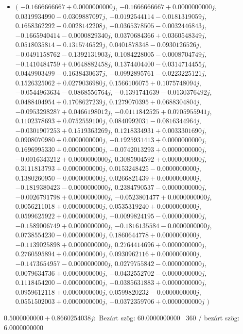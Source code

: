 \documentclass[14pt,a4paper]{article}
\begin{document}
\begin{itemize}
\item
$\big($
$-0.1666666667+0.0000000000j$, $-0.1666666667+0.0000000000j$, $0.0319934990-0.0309887097j$, $-0.0192544114-0.0181319059j$, $0.1658362292-0.0028142208j$, $-0.0365378505-0.0032446843j$, $-0.1665940414-0.0000829340j$, $0.0370684366+0.0360548349j$, $0.0518035814-0.1315746529j$, $0.0401878348-0.0930126526j$, $-0.0491158762-0.1392131903j$, $0.1084228005-0.0008704749j$, $-0.1410484759+0.0648882458j$, $0.1374404400-0.0314714455j$, $0.0449903499-0.1638430637j$, $-0.0992895761-0.0223225121j$, $0.1526325062+0.0279036980j$, $0.1566106075+0.1075748094j$, $-0.0544963634-0.0868556764j$, $-0.1391741639-0.0130376492j$, $0.0488404954+0.1708627239j$, $0.1279070395+0.0688304804j$, $-0.0953298287+0.0466198012j$, $-0.0111842525+0.0705955941j$, $0.1102378693+0.0752559100j$, $0.0840992031-0.0816344964j$, $-0.0301907253+0.1519363269j$, $0.1218334931+0.0033301690j$, $0.0908070980+0.0000000000j$, $-0.1925931413+0.0000000000j$, $0.1696995330+0.0000000000j$, $-0.0742013293+0.0000000000j$, $-0.0016343212+0.0000000000j$, $0.3085904592+0.0000000000j$, $0.3111813793+0.0000000000j$, $0.0153248425-0.0000000000j$, $0.1380260950-0.0000000000j$, $0.0266821439+0.0000000000j$, $-0.1819380423-0.0000000000j$, $0.2384790537-0.0000000000j$, $-0.0026791798+0.0000000000j$, $-0.0523801477+0.0000000000j$, $0.0056211018+0.0000000000j$, $0.0535319240+0.0000000000j$, $0.0599625922+0.0000000000j$, $-0.0099824195-0.0000000000j$, $-0.1589006749+0.0000000000j$, $-0.1816135584-0.0000000000j$, $0.0738554230-0.0000000000j$, $0.1860644778+0.0000000000j$, $-0.1139025898+0.0000000000j$, $0.2764414696+0.0000000000j$, $0.2760595894+0.0000000000j$, $0.0930962116+0.0000000000j$, $-0.1473654957-0.0000000000j$, $0.0279755842-0.0000000000j$, $0.0079634736+0.0000000000j$, $-0.0432552702-0.0000000000j$, $0.1118454200-0.0000000000j$, $-0.0385631883+0.0000000000j$, $0.0959612118+0.0000000000j$, $0.0599820232-0.0000000000j$, $0.0551502003+0.0000000000j$, $-0.0372359706+0.0000000000j$
$\big)$
\end{itemize}
$0.5000000000+0.8660254038j$:\
Bezárt szög: $60.0000000000$ \
360 / bezárt szög: $6.0000000000$\
\end{document}
